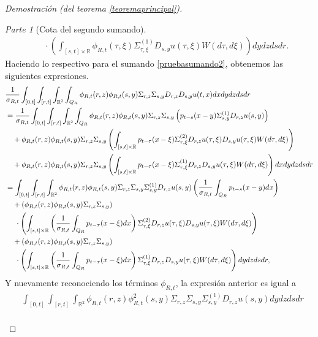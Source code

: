 \documentclass[letterpaper,twoside,12pt]{book}
\newcommand{\R}{\mathbb{R}}
\newcommand{\1}{\mathds{1}}
\theoremstyle{definition}
\theoremstyle{definition}
\theoremstyle{remark}
\newtheorem{proofpart}{Parte}
\theoremstyle{definition}
\theoremstyle{definition}
\theoremstyle{definition}
\theoremstyle{definition}
\theoremstyle{definition}
\begin{document}
\begin{proof}[Demostración (del teorema \ref{teoremaprincipal})]
\begin{proofpart}[Cota del segundo sumando]
\begin{align}
      &\ \ \ \ \cdot\left(\int_{[s,t]\times\R} \phi_{R,t}(\tau,\xi)\Sigma^{(1)}_{\tau,\xi}D_{s,y}u(\tau,\xi)W(d\tau,d\xi)\right)dy dz ds dr\label{pruebasumando4}.
   \end{align}
Haciendo lo respectivo para el sumando \eqref{pruebasumando2}, obtenemos las siguientes expresiones.
\begin{align}
   &\frac{1}{\sigma_{R,t}}\int_{[0,t]}\int_{[r,t]}\int_{\R^2}\int_{Q_R}\phi_{R,t}(r,z)\phi_{R,t}(s,y)\Sigma_{r,z}\Sigma_{s,y}D_{r,z}D_{s,y}u(t,x)dx dy dz ds dr\notag\\
   &=\frac{1}{\sigma_{R,t}}\int_{[0,t]}\int_{[r,t]}\int_{\R^2}\int_{Q_R}\phi_{R,t}(r,z)\phi_{R,t}(s,y)\Sigma_{r,z}\Sigma_{s,y}\left( p_{t-s}(x-y)\Sigma^{(1)}_{s,y}D_{r,z}u(s,y)\right)\notag\\
   &\ \ \ +\phi_{R,t}(r,z)\phi_{R,t}(s,y)\Sigma_{r,z}\Sigma_{s,y}\left(\int_{[s,t]\times \R} p_{t-\tau}(x-\xi)\Sigma^{(2)}_{\tau,\xi}D_{r,z}u(\tau,\xi)D_{s,y}u(\tau,\xi)W(d\tau,d\xi)\right)\notag\\
   &\ \ \ +\phi_{R,t}(r,z)\phi_{R,t}(s,y)\Sigma_{r,z}\Sigma_{s,y} \left(\int_{[s,t]\times \R}p_{t-\tau}(x-\xi)\Sigma^{(1)}_{\tau,\xi}D_{r,z}D_{s,y}u(\tau,\xi)W(d\tau,d\xi)\right) dx dy dz ds dr\notag\\
   &=\int_{[0,t]}\int_{[r,t]}\int_{\R^2}\phi_{R,t}(r,z)\phi_{R,t}(s,y)\Sigma_{r,z}\Sigma_{s,y}\Sigma^{(1)}_{s,y}D_{r,z}u(s,y)\left(\frac{1}{\sigma_{R,t}}\int_{Q_R} p_{t-s}(x-y)dx\right)\notag\\
   &\ \ \ +\left(\phi_{R,t}(r,z)\phi_{R,t}(s,y)\Sigma_{r,z}\Sigma_{s,y}\right)\notag\\
   & \ \ \ \ \cdot\left(\int_{[s,t]\times \R} \left(\frac{1}{\sigma_{R,t}}\int_{Q_R} p_{t-\tau}(x-\xi)dx\right)\Sigma^{(2)}_{\tau,\xi}D_{r,z}u(\tau,\xi)D_{s,y}u(\tau,\xi)W(d\tau,d\xi)\right)\notag\\
   &\ \ \ +\left(\phi_{R,t}(r,z)\phi_{R,t}(s,y)\Sigma_{r,z}\Sigma_{s,y}\right)\notag\\
   &\ \ \ \ \cdot \left(\int_{[s,t]\times \R}\left(\frac{1}{\sigma_{R,t}}\int_{Q_R} p_{t-\tau}(x-\xi)dx\right)\Sigma^{(1)}_{\tau,\xi}D_{r,z}D_{s,y}u(\tau,\xi)W(d\tau,d\xi)\right) dy dz ds dr,\notag
\end{align}
Y nuevamente reconociendo los términos $\phi_{R,t}$, la expresión anterior es igual a
\begin{align}
   &\int_{[0,t]}\int_{[r,t]}\int_{\R^2}\phi_{R,t}(r,z)\phi_{R,t}^2(s,y)\Sigma_{r,z}\Sigma_{s,y}\Sigma^{(1)}_{s,y}D_{r,z}u(s,y)dy dz ds dr\label{pruebasumando5}\\

\end{align}
\end{proofpart}
\end{proof}
\end{document}
